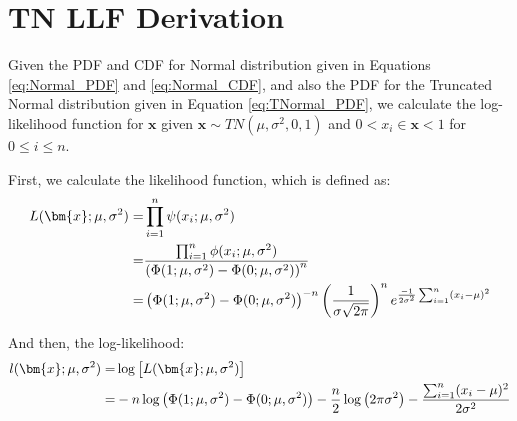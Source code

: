 
\chapter{TN LLF Derivation}
\label{AppendixB}

Given the PDF and CDF for Normal distribution given in Equations \ref{eq:Normal_PDF} and \ref{eq:Normal_CDF}, and also the PDF for the Truncated Normal distribution given in Equation \ref{eq:TNormal_PDF}, we calculate the log-likelihood function for $\bm{x}$ given $\bm{x} \sim TN(\mu,\sigma^2,0,1)$ and $0<x_i \in \bm{x} <1$ for $0\leq i \leq n$.

First, we calculate the likelihood function, which is defined as:
\begin{align} \label{eq:TN_lf}
L(\bm{x} ; \mu, \sigma^2) = & \prod _{i=1}^n \psi (x_i;\mu,\sigma^2) \notag \\
= & \frac{\prod _{i=1}^n \phi (x_i;\mu,\sigma^2)}{\left( \Phi(1;\mu,\sigma^2) - \Phi(0;\mu,\sigma^2) \right)^n} \\
= & \left( \Phi(1;\mu,\sigma^2) - \Phi(0;\mu,\sigma^2) \right)^{-n} \left( \frac{1}{\sigma \sqrt{2 \pi}}\right)^n e^{\frac{-1}{2\sigma^2}\sum_{i=1}^n (x_i-\mu)^2} \notag
\end{align}

And then, the log-likelihood:
\begin{align} \label{eq:TN_llfA}
l(\bm{x} ; \mu, \sigma^2) =& \log \left[ L(\bm{x} ; \mu, \sigma^2) \right] \notag \\
=& -n \log \left( \Phi(1;\mu,\sigma^2) - \Phi(0;\mu,\sigma^2) \right)-\frac{n}{2} \log \left( 2\pi \sigma^2 \right) - \frac{\sum_{i=1}^n (x_i-\mu)^2}{2\sigma^2}
\end{align}
